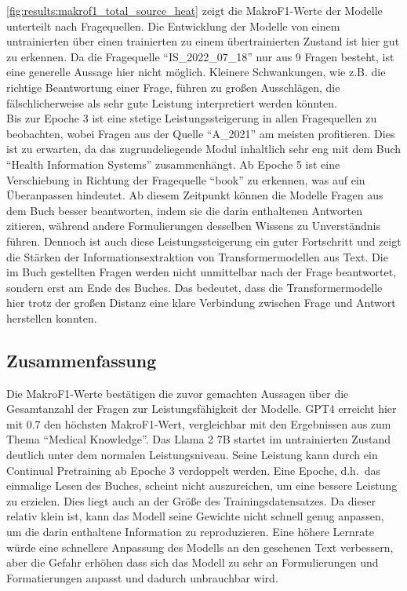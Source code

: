
\cref{fig:results:makrof1_total_source_heat} zeigt die MakroF1-Werte der Modelle unterteilt nach Fragequellen.
Die Entwicklung der Modelle von einem untrainierten über einen trainierten zu einem übertrainierten Zustand ist hier gut zu erkennen.
Da die Fragequelle \enquote{IS\_2022\_07\_18} nur aus \num{9} Fragen besteht, ist eine generelle Aussage hier nicht möglich.
Kleinere Schwankungen, wie z.B. die richtige Beantwortung einer Frage, führen zu großen Ausschlägen, die fälschlicherweise als sehr gute Leistung interpretiert werden könnten.\\

Bis zur Epoche 3 ist eine stetige Leistungssteigerung in allen Fragequellen zu beobachten, wobei Fragen aus der Quelle \enquote{A\_2021} am meisten profitieren.
Dies ist zu erwarten, da das zugrundeliegende Modul inhaltlich sehr eng mit dem Buch \enquote{Health Information Systems} zusammenhängt.
Ab Epoche 5 ist eine Verschiebung in Richtung der Fragequelle \enquote{book} zu erkennen, was auf ein Überanpassen hindeutet.
Ab diesem Zeitpunkt können die Modelle Fragen aus dem Buch besser beantworten, indem sie die darin enthaltenen Antworten zitieren, während andere Formulierungen desselben Wissens zu Unverständnis führen.
Dennoch ist auch diese Leistungssteigerung ein guter Fortschritt und zeigt die Stärken der Informationsextraktion von Transformermodellen aus Text.
Die im Buch gestellten Fragen werden nicht unmittelbar nach der Frage beantwortet, sondern erst am Ende des Buches.
Das bedeutet, dass die Transformermodelle hier trotz der großen Distanz eine klare Verbindung zwischen Frage und Antwort herstellen konnten.

\subsection{Zusammenfassung}
Die MakroF1-Werte bestätigen die zuvor gemachten Aussagen über die Gesamtanzahl der Fragen zur Leistungsfähigkeit der Modelle.
GPT4 erreicht hier mit \num{0.7} den höchsten MakroF1-Wert, vergleichbar mit den Ergebnissen aus \citet{gpt4} zum Thema \enquote{Medical Knowledge}.
Das Llama 2 7B startet im untrainierten Zustand deutlich unter dem normalen Leistungsniveau.
Seine Leistung kann durch ein Continual Pretraining ab Epoche 3 verdoppelt werden.
Eine Epoche, d.h.\ das einmalige Lesen des Buches, scheint nicht auszureichen, um eine bessere Leistung zu erzielen.
Dies liegt auch an der Größe des Trainingsdatensatzes.
Da dieser relativ klein ist, kann das Modell seine Gewichte nicht schnell genug anpassen, um die darin enthaltene Information zu reproduzieren.
Eine höhere Lernrate würde eine schnellere Anpassung des Modells an den gesehenen Text verbessern, aber die Gefahr erhöhen
dass sich das Modell zu sehr an Formulierungen und Formatierungen anpasst und dadurch unbrauchbar wird.\\


